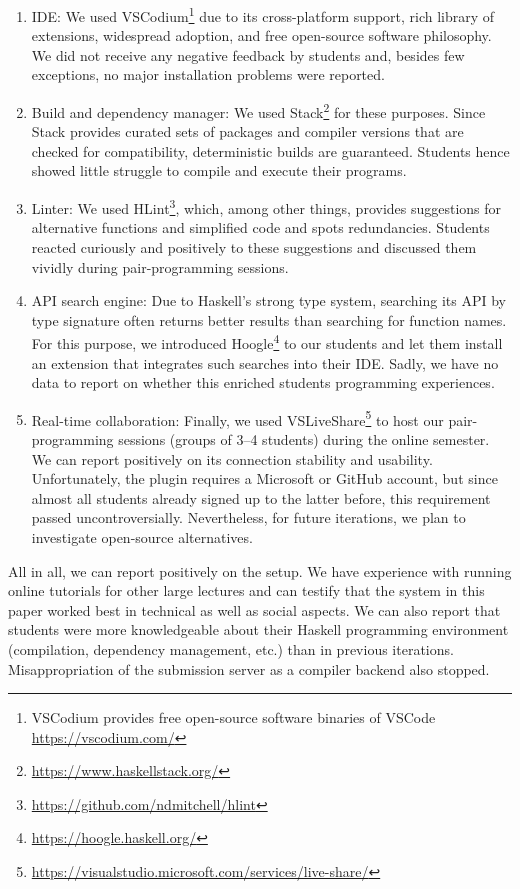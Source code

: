 \begin{enumerate}
  \item IDE: We used VSCodium\footnote{VSCodium provides free open-source software binaries of VSCode \url{https://vscodium.com/}} due to its cross-platform support,
    rich library of extensions,
    widespread adoption,
    and free open-source software philosophy.
    We did not receive any negative feedback by students
    and, besides few exceptions, no major installation problems were reported.
  \item Build and dependency manager: We used Stack\footnote{\url{https://www.haskellstack.org/}} for these purposes.
    Since Stack provides curated sets of packages and compiler versions that are checked for compatibility,
    deterministic builds are guaranteed.
    Students hence showed little struggle to compile and execute their programs.
  \item Linter: We used HLint\footnote{\url{https://github.com/ndmitchell/hlint}}, which, among other things,
    provides suggestions for alternative functions
    and simplified code and spots redundancies.
    Students reacted curiously and positively to these suggestions
    and discussed them vividly during pair-programming sessions.
  \item API search engine: Due to Haskell's strong type system,
    searching its API by type signature often returns better results than searching for function names.
    For this purpose, we introduced Hoogle\footnote{\url{https://hoogle.haskell.org/}} to our students and let them install an extension that integrates such searches into their IDE.
    Sadly, we have no data to report on whether this enriched students programming experiences.
  \item Real-time collaboration: Finally, we used VSLiveShare\footnote{\url{https://visualstudio.microsoft.com/services/live-share/}} to host our pair-programming sessions (groups of 3--4 students) during the online semester.
    We can report positively on its connection stability and usability.
    Unfortunately, the plugin requires a Microsoft or GitHub account,
    but since almost all students
    already signed up to the latter before,
    this requirement passed uncontroversially.
    Nevertheless, for future iterations,
    we plan to investigate open-source alternatives.
\end{enumerate}
All in all, we can report positively on the setup.
We have experience with running online tutorials for other large lectures and can testify that
the system in this paper worked best in technical as well as social aspects.
We can also report that students were more knowledgeable
about their Haskell programming environment (compilation, dependency management, etc.) than in previous iterations.
Misappropriation of the submission server as a compiler backend also stopped.
